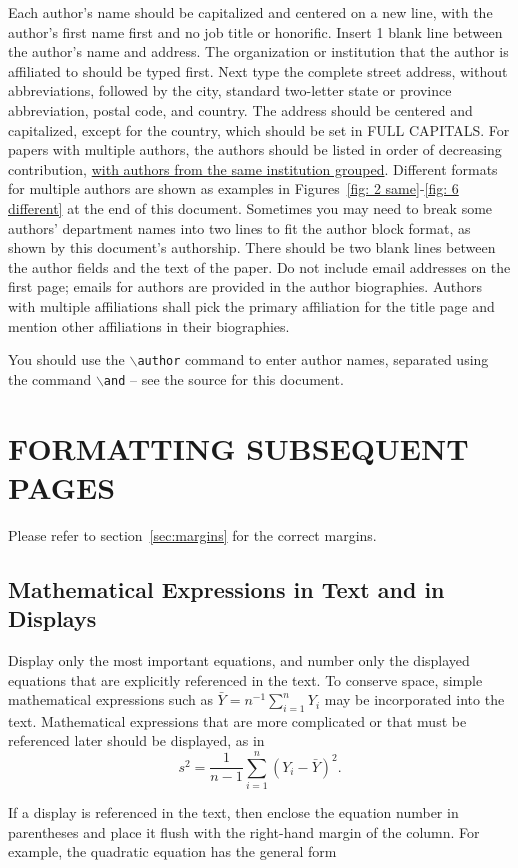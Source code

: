 \documentclass{wscpaperproc}
\theoremstyle{wsc}
\begin{document}
Each author's name should be capitalized and centered on a new line, with the author's first name first and no job title or honorific.
Insert 1 blank line between the author's name and address. 
The organization or institution that the author is affiliated to should be typed first.
Next type the complete street address, without abbreviations, followed by the city, standard two-letter state or province abbreviation, postal code, and country.
The address should be centered and capitalized, except for the country, which should be set in FULL CAPITALS.
For papers with multiple authors, the authors should be listed in order of decreasing contribution, \underline{with authors from the same institution grouped}.
Different formats for multiple authors are shown as examples in Figures~\ref{fig: 2 same}-\ref{fig: 6 different} at the end of this document.
Sometimes you may need to break some authors’ department names into two lines to fit the author block format, as shown by this document’s authorship.
There should be two blank lines between the author fields and the text of the paper. 
Do not include email addresses on the first page; emails for authors are provided in the author biographies. Authors with multiple affiliations shall pick the primary affiliation for the title page and mention other affiliations in their biographies.

You should use the {\tt $\backslash$author} command to enter author names, separated using the command {\tt $\backslash$and} -- see the source for this document.

\section{FORMATTING SUBSEQUENT PAGES}
Please refer to section~\ref{sec:margins} for the correct margins.

\subsection{Mathematical Expressions in Text and in Displays}
Display only the most important equations, and number only the displayed equations that are explicitly referenced in the text.
To conserve space, simple mathematical expressions such as $\bar Y = n^{-1} \sum_{i=1}^n Y_i$ may be incorporated into the text.
Mathematical expressions that are more complicated or that must be referenced later should be displayed, as in
$$s^2 = \frac 1 {n-1} \sum_{i=1}^n (Y_i - \bar Y)^2.$$

If a display is referenced in the text, then enclose the equation number in parentheses and place it flush with the right-hand margin of the
column. For example, the quadratic equation has the general form
\end{document}
